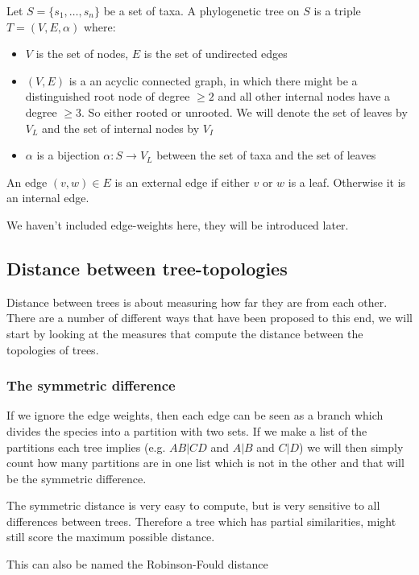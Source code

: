     Let $S=\{s_1,\dots,s_n\}$ be a set of taxa. A phylogenetic tree on $S$ is a 
    triple $T=(V,E,\alpha)$ where:
    \begin{itemize}
        \item $V$ is the set of nodes, $E$ is the set of undirected edges
        \item $(V,E)$ is a an acyclic connected graph, in which there might be 
        a distinguished root node of degree $\geq 2$ and all other internal 
        nodes have a degree $\geq 3$. So either rooted or unrooted. We will 
        denote the set of leaves by $V_L$ and the set of internal nodes by $V_I$
        \item $\alpha$ is a bijection $\alpha: S \rightarrow V_L$ between the 
        set of taxa and the set of leaves
    \end{itemize}
    An edge $(v,w) \in E$ is an external edge if either $v$ or $w$ is a leaf. 
    Otherwise it is an internal edge.
    
    We haven't included edge-weights here, they will be introduced later.
    
    \subsection{Distance between tree-topologies}
    Distance between trees is about measuring how far they are from each other. 
    There are a number of different ways that have been proposed to this end, 
    we will start by looking at the measures that compute the distance between 
    the topologies of trees.
    
    \subsubsection{The symmetric difference}
    If we ignore the edge weights, then each edge can be seen as a branch which 
    divides the species into a partition with two sets. If we make a list of 
    the partitions each tree implies (e.g. $AB|CD$ and $A|B$ and $C|D$)  we 
    will then simply count how many partitions are in one list which is not in 
    the other and that will be the symmetric difference.
    
    The symmetric distance is very easy to compute, but is very sensitive to 
    all differences between trees. Therefore a tree which has partial 
    similarities, might still score the maximum possible distance.
    
    This can also be named the Robinson-Fould distance
    
